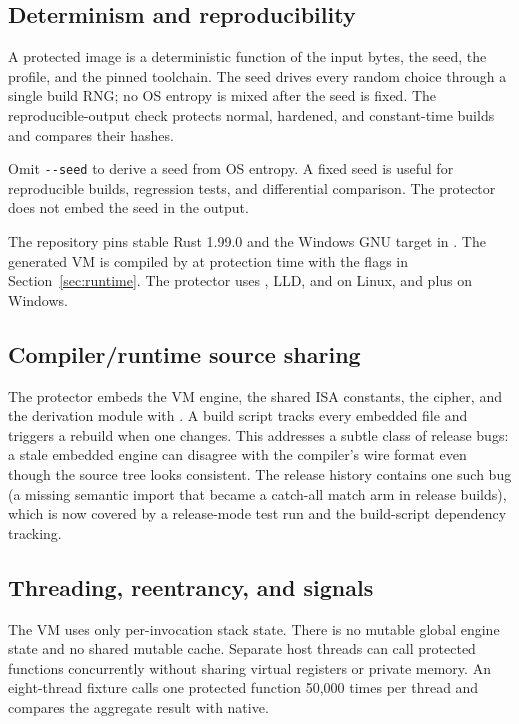 \subsection{Determinism and reproducibility}

A protected image is a deterministic function of the input bytes, the seed, the
profile, and the pinned toolchain. The seed drives every random choice through a
single build RNG; no OS entropy is mixed after the seed is fixed. The
reproducible-output check protects normal, hardened, and constant-time builds and
compares their hashes.

Omit \verb|--seed| to derive a seed from OS entropy. A fixed seed is useful for
reproducible builds, regression tests, and differential comparison. The
protector does not embed the seed in the output.

The repository pins stable Rust 1.99.0 and the Windows GNU target in
. The generated VM is compiled by  at
protection time with the flags in Section~\ref{sec:runtime}. The protector uses
, LLD, and  on Linux, and
 plus  on Windows.

\subsection{Compiler/runtime source sharing}

The protector embeds the VM engine, the shared ISA constants, the cipher, and
the derivation module with . A build script tracks every
embedded file and triggers a rebuild when one changes. This addresses a subtle
class of release bugs: a stale embedded engine can disagree with the compiler's
wire format even though the source tree looks consistent. The release history
contains one such bug (a missing semantic import that became a catch-all match
arm in release builds), which is now covered by a release-mode test run and the
build-script dependency tracking.

\subsection{Threading, reentrancy, and signals}

The VM uses only per-invocation stack state. There is no mutable global engine
state and no shared mutable cache. Separate host threads can call protected
functions concurrently without sharing virtual registers or private memory. An
eight-thread fixture calls one protected function 50,000 times per thread and
compares the aggregate result with native.

